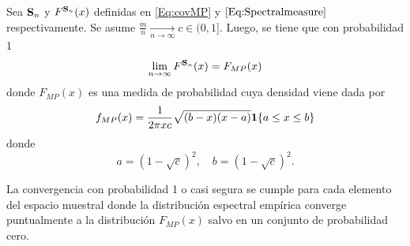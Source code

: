 \begin{theorem}\label{Th:MP1}
	Sea $\mathbf{S}_n$ y $F^{\mathbf{S}_n}(x)$ definidas en \eqref{Eq:covMP} y $\eqref{Eq:Spectralmeasure}$ respectivamente. Se asume $\frac{m}{n}\xrightarrow[n\to\infty]{} c\in(0,1]$. Luego, se tiene que con probabilidad 1
	\begin{equation}
		\lim\limits_{n\to\infty}F^{\mathbf{S}_n}(x)=F_{MP}(x)
		\label{Eq:MP_law}
	\end{equation}
	donde $F_{MP}(x)$ es una medida de probabilidad cuya densidad viene dada por
	\begin{equation}
		f_{MP}(x) = \frac{1}{2\pi x c}\sqrt{(b-x)(x-a)}\mathbf{1}\{a\le x \le b\}
		\label{Eq:MP_law2}
	\end{equation}
	donde 
	\[a = (1-\sqrt{c})^2, \quad b = (1-\sqrt{c})^2.\]
\end{theorem}
La convergencia con probabilidad 1 o casi segura se cumple para cada elemento del espacio muestral donde la distribución espectral empírica converge puntualmente a la distribución $F_{MP}(x)$ salvo en un conjunto de probabilidad cero.


